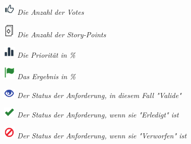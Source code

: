 \begin{figure}[!htb]
		\includegraphics[width=0.05\textwidth]{images/thumbs.pdf}
	\textit{Die Anzahl der Votes}
\end{figure}
\vspace{-15pt}
\begin{figure}[!htb]
		\includegraphics[width=0.05\textwidth]{images/cards.pdf}
	\textit{Die Anzahl der Story-Points}
\end{figure}
\vspace{-15pt}
\begin{figure}[!htb]
		\includegraphics[width=0.05\textwidth]{images/stats.pdf}
	\textit{Die Priorität in \%}
\end{figure}
\vspace{-15pt}
\begin{figure}[!htb]
		\includegraphics[width=0.05\textwidth]{images/flag.pdf}
	\textit{Das Ergebnis in \%}
\end{figure}
\vspace{-15pt}
\begin{figure}[!htb]
		\includegraphics[width=0.05\textwidth]{images/eye.pdf}
	\textit{Der Status der Anforderung, in diesem Fall "Valide"}
\end{figure}
\vspace{-15pt}
\begin{figure}[!htb]
		\includegraphics[width=0.05\textwidth]{images/ok.pdf}
	\textit{Der Status der Anforderung, wenn sie "Erledigt" ist}
\end{figure}
\vspace{-15pt}
\begin{figure}[!htb]
		\includegraphics[width=0.05\textwidth]{images/ban.pdf}
	\textit{Der Status der Anforderung, wenn sie "Verworfen" ist}
\end{figure}

